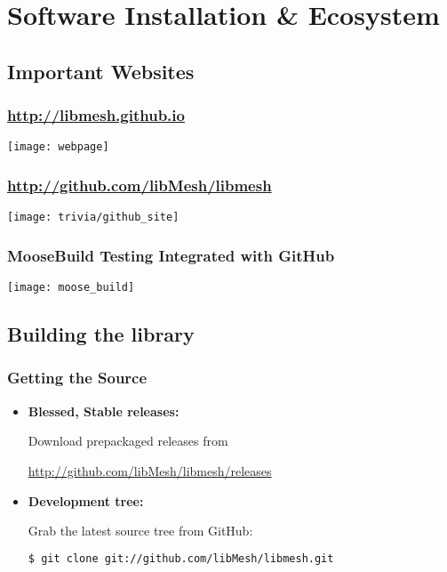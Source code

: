 \section{Software Installation \& Ecosystem}
\subsection{Important Websites}

\frame
{
\frametitle{\url{http://libmesh.github.io}}

\centerline{\texttt{[image: webpage]}}
}


\frame
{
\frametitle{\url{http://github.com/libMesh/libmesh}}

\centerline{\texttt{[image: trivia/github\_site]}}
}


\frame
{
\frametitle{MooseBuild Testing Integrated with GitHub}

\centerline{\texttt{[image: moose\_build]}}
}



\subsection{Building the library}

\begin{frame}[fragile]
  \frametitle{Getting the \libMesh{} Source}

  \begin{block}{}
    \begin{itemize}
    \item \textbf{Blessed, Stable releases:}

      Download prepackaged releases from

      \scriptsize{\url{http://github.com/libMesh/libmesh/releases}}
      \normalsize
    \item \textbf{Development tree:}

      Grab the latest source tree from GitHub:
      \begin{lstlisting}[language=bash]
$ git clone git://github.com/libMesh/libmesh.git
      \end{lstlisting}
    \end{itemize}
  \end{block}
\end{frame}

